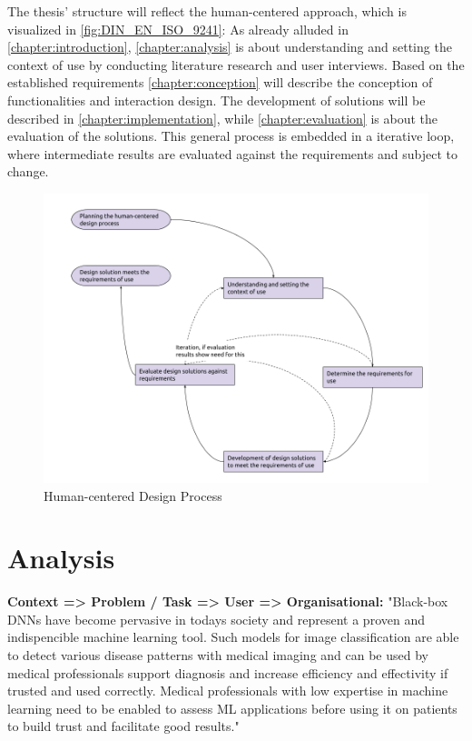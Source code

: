 \documentclass[11pt,a4paper,english]{scrreprt}
\newenvironment{comment}
  {\par\medskip
   \begingroup\color{olive}%
   }
 {\endgroup
  \medskip}
\begin{document}
The thesis' structure will reflect the human-centered approach, which is visualized in \autoref{fig:DIN_EN_ISO_9241}: As already alluded in \autoref{chapter:introduction}, \autoref{chapter:analysis} is about understanding and setting the context of use by conducting literature research and user interviews. Based on the established requirements \autoref{chapter:conception} will describe the conception of functionalities and interaction design. The development of solutions will be described in \autoref{chapter:implementation}, while \autoref{chapter:evaluation} is about the evaluation of the solutions. This general process is embedded in a iterative loop, where intermediate results are evaluated against the requirements and subject to change.
\begin{figure}[htbp]
    \centering
    \includegraphics[width=\textwidth]{img/figures/DIN_EN_ISO_9241-210.png}
    \caption{Human-centered Design Process \parencite{DIN}}
    \label{fig:DIN_EN_ISO_9241}
\end{figure}

\newpage
\chapter{Analysis}\label{chapter:analysis}
\begin{comment}
    \textbf{Context => Problem / Task => User => Organisational:} "Black-box DNNs have become pervasive in todays society and represent a proven and indispencible machine learning tool. Such models for image classification are able to detect various disease patterns with medical imaging and can be used by medical professionals support diagnosis and increase efficiency and effectivity if trusted and used correctly. Medical professionals with low expertise in machine learning need to be enabled to assess ML applications before using it on patients to build trust and facilitate good results."
\end{comment}
\end{document}
